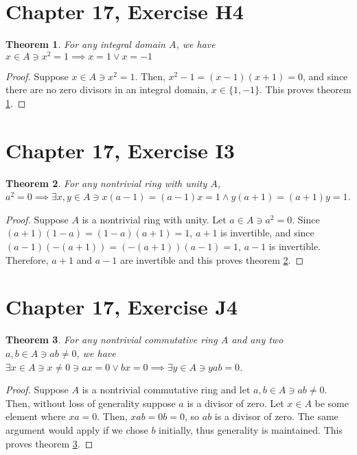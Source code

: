 \documentclass[12pt]{article}
\newtheorem{thm}{Theorem}
\begin{document}
\section{Chapter 17, Exercise H4}

\begin{thm} \label{thm3}
	For any integral domain $A$, we have $x \in A \ni x^2 = 1 \implies x = 1 \lor x = -1$
\end{thm}

\begin{proof}
	Suppose $x \in A \ni x^2 = 1$.
	Then, $x^2 - 1 = (x - 1)(x + 1) = 0$,
	and since there are no zero divisors
	in an integral domain,
	$x \in \{1, -1\}$.
	This proves theorem \ref{thm3}.
\end{proof}

\section{Chapter 17, Exercise I3}


\begin{thm} \label{thm4}
	For any nontrivial ring with unity $A$, $a^2 = 0 \implies
	\exists x,y \in A \ni x(a-1) = (a-1)x = 1 \land y(a+1) = (a+1)y = 1$.
\end{thm}

\begin{proof}
	Suppose $A$ is a nontrivial ring with unity.
	Let $a \in A \ni a^2 = 0$.
	Since $(a+1)(1-a) = (1-a)(a+1) = 1$, $a + 1$ is invertible,
	and since $(a - 1)(-(a+1)) = (-(a+1))(a-1) = 1$, $a - 1$ is invertible.
	Therefore, $a+1$ and $a-1$ are invertible and this proves theorem \ref{thm4}.
\end{proof}

\section{Chapter 17, Exercise J4}

\begin{thm} \label{thm5}
	For any nontrivial commutative ring $A$ and any two $a,b \in A \ni ab \neq 0$,
	we have $\exists x \in A \ni x \neq 0 \ni ax = 0 \lor bx = 0
	\implies \exists y \in A \ni yab = 0$.
\end{thm}

\begin{proof}
	Suppose $A$ is a nontrivial commutative ring
	and let $a,b \in A \ni ab \neq 0$.
	Then, without loss of generality suppose $a$ is a divisor of zero.
	Let $x \in A$ be some element where $xa = 0$.
	Then, $xab = 0b = 0$, so $ab$ is a divisor of zero.
	The same argument would apply if we chose $b$ initially,
	thus generality is maintained.
	This proves theorem \ref{thm5}.
\end{proof}
\end{document}
